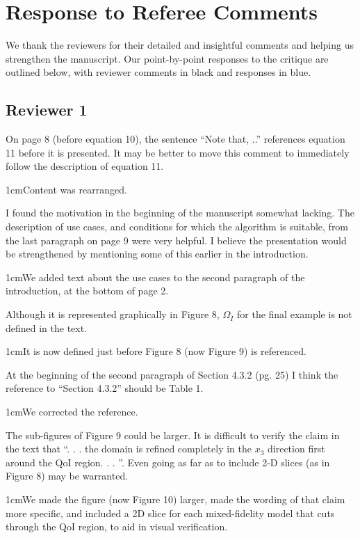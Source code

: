 \documentclass[12pt, letterpaper]{article}
\newcommand{\answer}[1]{\begin{adjustwidth}{1cm}{}{\color{blue}#1}\end{adjustwidth}}
\newcommand{\blue}[1]{{\color{blue}#1}}
\begin{document}
\section*{Response to Referee Comments}

We thank the reviewers for their detailed and insightful comments and helping us strengthen the manuscript. Our point-by-point responses to the critique are outlined below, with reviewer comments in black and \blue{responses in blue}. 



\subsection*{Reviewer 1}

On page 8 (before equation 10), the sentence “Note that, ..” references equation 11 before it is
presented. It may be better to move this comment to immediately follow the description of equation
11.

\answer{Content was rearranged.}

I found the motivation in the beginning of the manuscript somewhat lacking. The description of use
cases, and conditions for which the algorithm is suitable, from the last paragraph on page 9 were very
helpful. I believe the presentation would be strengthened by mentioning some of this earlier in the
introduction.

\answer{We added text about the use cases to the second paragraph of the introduction, at the bottom of page 2.}

Although it is represented graphically in Figure 8, $\Omega_I$ for the final example is not defined in the text.

\answer{It is now defined just before Figure 8 (now Figure 9) is referenced.}

At the beginning of the second paragraph of Section 4.3.2 (pg. 25) I think the reference to “Section
4.3.2” should be Table 1.

\answer{We corrected the reference.}

The sub-figures of Figure 9 could be larger. It is difficult to verify the claim in the text that “. . . the
domain is refined completely in the $x_3$ direction first around the QoI region. . . ”. Even going as far as
to include 2-D slices (as in Figure 8) may be warranted.

\answer{We made the figure (now Figure 10) larger, made the wording of that claim more specific, and included a 2D slice for each mixed-fidelity model that cuts through the QoI region, to aid in visual verification.}
\end{document}
